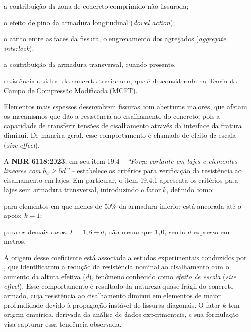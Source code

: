 \begin{alineas}
\item a contribuição da zona de concreto comprimido não fissurada;
\item o efeito de pino da armadura longitudinal (\textit{dowel action});
\item o atrito entre as faces da fissura, o engrenamento dos agregados (\textit{aggregate interlock}).
\item a contribuição da armadura transversal, quando presente.
\item resistência residual do concreto tracionado, que é desconsiderada na Teoria do Campo de Compressão Modificada (MCFT).
\end{alineas}

Elementos mais espessos desenvolvem fissuras com aberturas maiores, que afetam os mecanismos que dão a resistência ao cisalhamento do concreto, pois a capacidade de transferir tensões de cisalhamento através da interface da fratura diminui. De maneira geral, esse comportamento é chamado de efeito de escala (\textit{size effect}).

A \textbf{NBR 6118:2023}, em seu item 19.4 -- \textit{“Força cortante em lajes e elementos lineares com $b_w \geq 5d$”} -- estabelece os critérios para verificação da resistência ao cisalhamento em lajes. Em particular, o item 19.4.1 apresenta os critérios para lajes sem armadura transversal, introduzindo o fator $k$, definido como:

\begin{alineas}
    \item para elementos em que menos de 50\% da armadura inferior está ancorada até o apoio: $k = 1$;
    \item para os demais casos: $k = 1{,}6 - d$, não menor que $1{,}0$, sendo $d$ expresso em metros.
\end{alineas}

A origem desse coeficiente está associada a estudos experimentais conduzidos por \textcite{Hedman1975shear}, que identificaram a redução da resistência nominal ao cisalhamento com o aumento da altura efetiva ($d$), fenômeno conhecido como \textit{efeito de escala} (\textit{size effect}). Esse comportamento é resultado da natureza quase-frágil do concreto armado, cuja resistência ao cisalhamento diminui em elementos de maior profundidade devido à propagação instável de fissuras diagonais. O fator $k$ tem origem empírica, derivada da análise de dados experimentais, e sua formulação visa capturar essa tendência observada.

